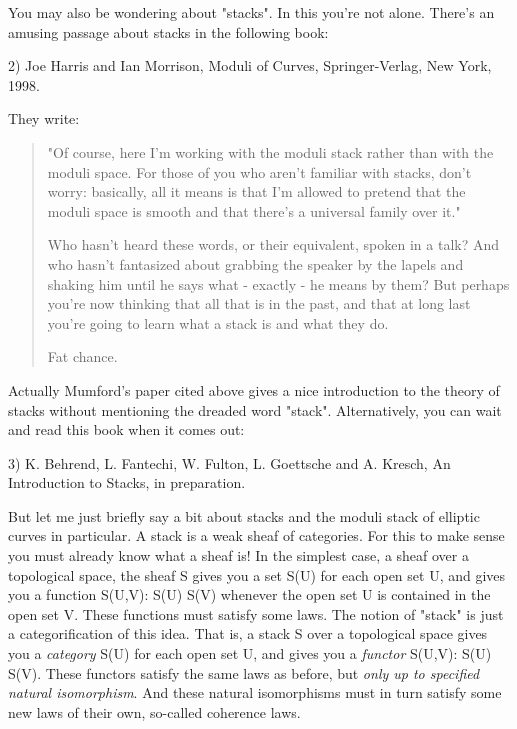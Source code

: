You may also be wondering about "stacks".  In this you're not alone.
There's an amusing passage about stacks in the following book:

2) Joe Harris and Ian Morrison, Moduli of Curves, Springer-Verlag, New
York, 1998.

They write:

\begin{quote}
     "Of course, here I'm working with the moduli stack rather than 
     with the moduli space.  For those of you who aren't familiar with
     stacks, don't worry: basically, all it means is that I'm allowed to
     pretend that the moduli space is smooth and that there's a universal
     family over it."

     Who hasn't heard these words, or their equivalent, spoken in a
     talk?  And who hasn't fantasized about grabbing the speaker by
     the lapels and shaking him until he says what - exactly - he means
     by them?  But perhaps you're now thinking that all that is in the
     past, and that at long last you're going to learn what a stack is
     and what they do.

     Fat chance.  

\end{quote}
Actually Mumford's paper cited above gives a nice introduction to
the theory of stacks without mentioning the dreaded word "stack".  
Alternatively, you can wait and read this book when it comes out:

3) K. Behrend, L. Fantechi, W. Fulton, L. Goettsche and A. Kresch,
An Introduction to Stacks, in preparation.

But let me just briefly say a bit about stacks and the moduli stack of
elliptic curves in particular.  A stack is a weak sheaf of categories.
For this to make sense you must already know what a sheaf is!  In the
simplest case, a sheaf over a topological space, the sheaf S gives you
a set S(U) for each open set U, and gives you a function S(U,V): S(U)
\to  S(V) whenever the open set U is contained in the open set V.  These
functions must satisfy some laws.  The notion of "stack" is just a
categorification of this idea.  That is, a stack S over a topological
space gives you a \emph{category} S(U) for each open set U, and gives you a
\emph{functor} S(U,V): S(U) \to  S(V).  These functors satisfy the same laws
as before, but \emph{only up to specified natural isomorphism}.  And these
natural isomorphisms must in turn satisfy some new laws of their own,
so-called coherence laws.


